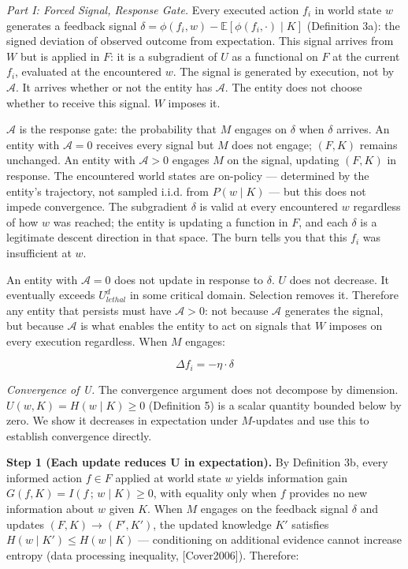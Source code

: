 \documentclass[
]{article}
\begin{document}
\emph{Part I: Forced Signal, Response Gate.} Every executed action
\(f_i\) in world state \(w\) generates a feedback signal
\(\delta = \phi(f_i, w) - \mathbb{E}[\phi(f_i, \cdot) \mid K]\)
(Definition 3a): the signed deviation of observed outcome from
expectation. This signal arrives from \(W\) but is applied in \(F\): it
is a subgradient of \(U\) as a functional on \(F\) at the current
\(f_i\), evaluated at the encountered \(w\). The signal is generated by
execution, not by \(\mathcal{A}\). It arrives whether or not the entity
has \(\mathcal{A}\). The entity does not choose whether to receive this
signal. \(W\) imposes it.

\(\mathcal{A}\) is the response gate: the probability that \(M\) engages
on \(\delta\) when \(\delta\) arrives. An entity with
\(\mathcal{A} = 0\) receives every signal but \(M\) does not engage;
\((F, K)\) remains unchanged. An entity with \(\mathcal{A} > 0\) engages
\(M\) on the signal, updating \((F, K)\) in response. The encountered
world states are on-policy --- determined by the entity's trajectory,
not sampled i.i.d. from \(P(w \mid K)\) --- but this does not impede
convergence. The subgradient \(\delta\) is valid at every encountered
\(w\) regardless of how \(w\) was reached; the entity is updating a
function in \(F\), and each \(\delta\) is a legitimate descent direction
in that space. The burn tells you that this \(f_i\) was insufficient at
\(w\).

An entity with \(\mathcal{A} = 0\) does not update in response to
\(\delta\). \(U\) does not decrease. It eventually exceeds
\(U_{lethal}^d\) in some critical domain. Selection removes it.
Therefore any entity that persists must have \(\mathcal{A} > 0\): not
because \(\mathcal{A}\) generates the signal, but because
\(\mathcal{A}\) is what enables the entity to act on signals that \(W\)
imposes on every execution regardless. When \(M\) engages:

\[\Delta f_i = -\eta \cdot \delta\]

\emph{Convergence of U.} The convergence argument does not decompose
by dimension. \(U(w, K) = H(w \mid K) \geq 0\) (Definition 5) is a
scalar quantity bounded below by zero. We show it decreases in
expectation under \(M\)-updates and use this to establish convergence
directly.

\textbf{Step 1 (Each update reduces U in expectation).} By Definition
3b, every informed action \(f \in F\) applied at world state \(w\) yields
information gain \(G(f, K) = I(f\,;\,w \mid K) \geq 0\), with equality
only when \(f\) provides no new information about \(w\) given \(K\).
When \(M\) engages on the feedback signal \(\delta\) and updates
\((F, K) \to (F', K')\), the updated knowledge \(K'\) satisfies
\(H(w \mid K') \leq H(w \mid K)\) --- conditioning on additional
evidence cannot increase entropy (data processing inequality,
{[}Cover2006{]}). Therefore:
\end{document}
